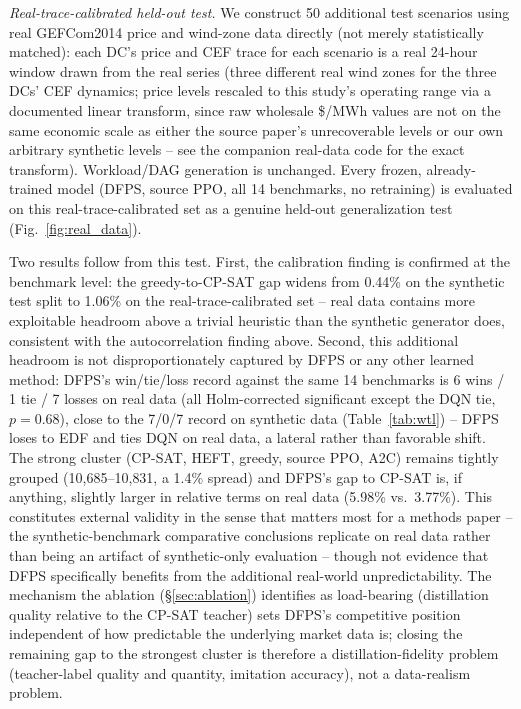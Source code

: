 \documentclass[journal]{IEEEtran}
\begin{document}
\textit{Real-trace-calibrated held-out test.} We construct 50 additional test scenarios using real GEFCom2014 price and wind-zone data directly (not merely statistically matched): each DC's price and CEF trace for each scenario is a real 24-hour window drawn from the real series (three different real wind zones for the three DCs' CEF dynamics; price levels rescaled to this study's operating range via a documented linear transform, since raw wholesale \$/MWh values are not on the same economic scale as either the source paper's unrecoverable levels or our own arbitrary synthetic levels -- see the companion real-data code for the exact transform). Workload/DAG generation is unchanged. Every frozen, already-trained model (DFPS, source PPO, all 14 benchmarks, no retraining) is evaluated on this real-trace-calibrated set as a genuine held-out generalization test (Fig.~\ref{fig:real_data}).

Two results follow from this test. First, the calibration finding is confirmed at the benchmark level: the greedy-to-CP-SAT gap widens from 0.44\% on the synthetic test split to 1.06\% on the real-trace-calibrated set -- real data contains more exploitable headroom above a trivial heuristic than the synthetic generator does, consistent with the autocorrelation finding above. Second, this additional headroom is not disproportionately captured by DFPS or any other learned method: DFPS's win/tie/loss record against the same 14 benchmarks is 6 wins / 1 tie / 7 losses on real data (all Holm-corrected significant except the DQN tie, $p=0.68$), close to the 7/0/7 record on synthetic data (Table~\ref{tab:wtl}) -- DFPS loses to EDF and ties DQN on real data, a lateral rather than favorable shift. The strong cluster (CP-SAT, HEFT, greedy, source PPO, A2C) remains tightly grouped (10{,}685--10{,}831, a 1.4\% spread) and DFPS's gap to CP-SAT is, if anything, slightly larger in relative terms on real data (5.98\% vs.\ 3.77\%). This constitutes external validity in the sense that matters most for a methods paper -- the synthetic-benchmark comparative conclusions replicate on real data rather than being an artifact of synthetic-only evaluation -- though not evidence that DFPS specifically benefits from the additional real-world unpredictability. The mechanism the ablation (\S\ref{sec:ablation}) identifies as load-bearing (distillation quality relative to the CP-SAT teacher) sets DFPS's competitive position independent of how predictable the underlying market data is; closing the remaining gap to the strongest cluster is therefore a distillation-fidelity problem (teacher-label quality and quantity, imitation accuracy), not a data-realism problem.
\end{document}
